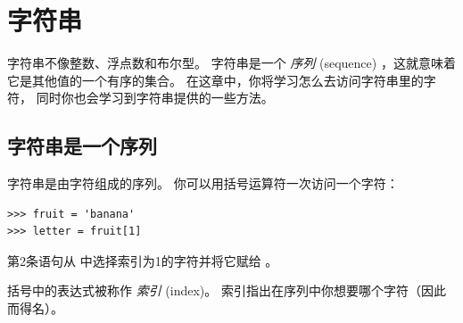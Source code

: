 

\chapter{字符串}
\label{strings}


字符串不像整数、浮点数和布尔型。 字符串是一个 {\em 序列} (sequence) ，这就意味着
它是其他值的一个有序的集合。 在这章中，你将学习怎么去访问字符串里的字符， 同时你也会学习到字符串提供的一些方法。

\section{字符串是一个序列}

  
  


字符串是由字符组成的序列。 你可以用括号运算符一次访问一个字符：

\begin{lstlisting}
>>> fruit = 'banana'
>>> letter = fruit[1]
\end{lstlisting}

%

第2条语句从  中选择索引为1的字符并将它赋给  。


括号中的表达式被称作 {\em 索引} (index)。 索引指出在序列中你想要哪个字符（因此而得名）。

